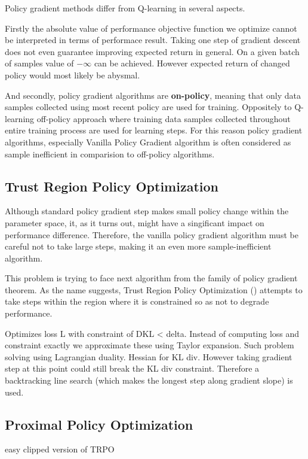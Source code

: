Policy gradient methods differ from Q-learning in several aspects.

Firstly the absolute value of performance objective function we optimize cannot be interpreted in terms of performace result.
Taking one step of gradient descent does not even guarantee improving expected return in general.
On a given batch of samples value of $-\infty$ can be achieved. 
However expected return of changed policy would most likely be abysmal.

And secondly, policy gradient algorithms are \textbf{on-policy}, meaning that only data samples collected using most recent policy are used for training.
Oppositely to Q-learning off-policy approach where training data samples collected throughout entire training process are used for learning steps.
For this reason policy gradient algorithms, especially Vanilla Policy Gradient algorithm is often considered as sample inefficient in comparision to off-policy algorithms.


\subsection{Trust Region Policy Optimization}
Although standard policy gradient step makes small policy change within the parameter space, it, as it turns out, might have a singificant impact on performance difference.
Therefore, the vanilla policy gradient algorithm must be careful not to take large steps, making it an even more sample-inefficient algorithm.

This problem is trying to face next algorithm from the family of policy gradient theorem.
As the name suggests, Trust Region Policy Optimization (\cite{TRPO}) attempts to take steps within the region where it is constrained so as not to degrade performance.

Optimizes loss L with constraint of DKL < delta.
Instead of computing loss and constraint exactly we approximate these using Taylor expansion.
Such problem solving using Lagrangian duality. 
Hessian for KL div.
However taking gradient step at this point could still break the KL div constraint. 
Therefore a backtracking line search (which makes the longest step along gradient slope) is used.


\subsection{Proximal Policy Optimization}
easy clipped version of TRPO


